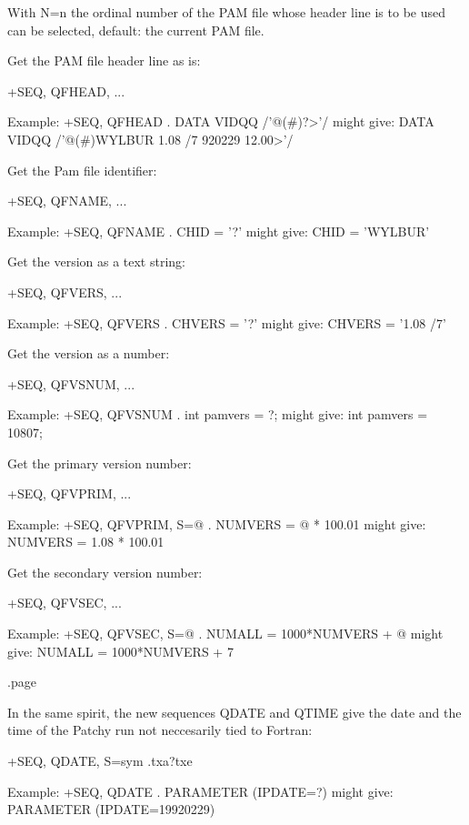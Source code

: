    With N=n the ordinal number of the PAM file whose header line
   is to be used can be selected, default: the current PAM file.

\item
Get the PAM file header line as is:

   +SEQ, QFHEAD, ...

         Example: +SEQ, QFHEAD  .      DATA VIDQQ /'@(#)?>'/
      might give:       DATA VIDQQ /'@(#)WYLBUR  1.08 /7  920229 12.00>'/

\item
Get the Pam file identifier:

   +SEQ, QFNAME, ...

         Example: +SEQ, QFNAME  .      CHID = '?'
      might give:       CHID = 'WYLBUR'

\item
Get the version as a text string:

   +SEQ, QFVERS, ...

         Example: +SEQ, QFVERS  .      CHVERS = '?'
      might give:       CHVERS = '1.08 /7'

\item
Get the version as a number:

   +SEQ, QFVSNUM, ...

         Example: +SEQ, QFVSNUM  .      int pamvers = ?;
      might give:       int pamvers = 10807;

\item
Get the primary version number:

   +SEQ, QFVPRIM, ...

         Example: +SEQ, QFVPRIM, S=@  .      NUMVERS = @ * 100.01
      might give:       NUMVERS = 1.08 * 100.01

\item
Get the secondary version number:

   +SEQ, QFVSEC, ...

         Example: +SEQ, QFVSEC, S=@  .      NUMALL = 1000*NUMVERS + @
      might give:       NUMALL = 1000*NUMVERS + 7


.page




In the same spirit, the new sequences QDATE and QTIME give the date
and the time of the Patchy run not neccesarily tied to Fortran:

\item
+SEQ, QDATE, S=sym  .txa?txe

         Example: +SEQ, QDATE   .      PARAMETER (IPDATE=?)
      might give:       PARAMETER (IPDATE=19920229)

